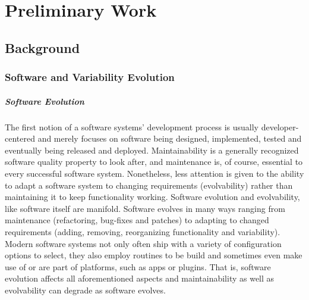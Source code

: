 \documentclass[bibliography=totoc]{tubsreprt}
\begin{document}
\chapter{Preliminary Work}
\section{Background} \label{sec:background}
\subsection{Software and Variability Evolution}
\paragraph*{Software Evolution}
The first notion of a software systems' development process is usually
developer-centered and merely focuses on software being designed, implemented,
tested and eventually being released and deployed. Maintainability is a
generally recognized software quality property to look after, and maintenance
is, of course, essential to every successful software system. Nonetheless, less
attention is given to the ability to adapt a software system to changing
requirements (evolvability) rather than maintaining it to keep functionality
working. Software evolution and evolvability, like software itself are
manifold. Software evolves in many ways ranging from maintenance (refactoring,
bug-fixes and patches) to adapting to changed requirements (adding, removing,
reorganizing functionality and variability).
Modern software systems not only often ship with a variety of configuration
options to select, they also employ routines to be build and sometimes even
make use of or are part of platforms, such as apps or plugins. That is,
software evolution affects all aforementioned aspects and maintainability as
well as evolvability can degrade as software evolves.
\end{document}
